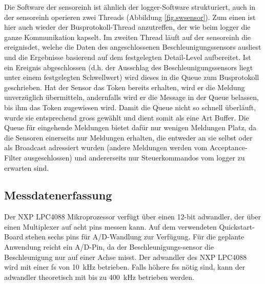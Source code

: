Die Software der \gls{sensoreinh} ist ähnlich der \gls{logger}-Software strukturiert, auch in der \gls{sensoreinh} operieren zwei Threads (Abbildung \ref{fig.swsensor}). Zum einen ist hier auch wieder der Busprotokoll-Thread anzutreffen, der wie beim \gls{logger} die ganze Kommunikation kapselt. Im zweiten Thread läuft auf der \gls{sensoreinh} die \gls{ereignisdet}, welche die Daten des angeschlossenen Beschleunigungssensors ausliest und die Ergebnisse basierend auf dem festgelegten Detail-Level aufbereitet. Ist ein Ereignis abgeschlossen (d.h. der Ausschlag des Beschleunigungssensors liegt unter einem festgelegten Schwellwert) wird dieses in die Queue zum Busprotokoll geschrieben. Hat der Sensor das Token bereits erhalten, wird er die Meldung unverzüglich übermitteln, andernfalls wird er die Message in der Queue belassen, bis ihm das Token zugewiesen wird. Damit die Queue nicht so schnell überläuft, wurde sie entsprechend gross gewählt und dient somit als eine Art Buffer. Die Queue für eingehende Meldungen bietet dafür nur wenigen Meldungen Platz, da die Sensoren einerseits nur Meldungen erhalten, die entweder an sie selbst oder als Broadcast adressiert wurden (andere Meldungen werden vom Acceptance-Filter ausgeschlossen) und andererseits nur Steuerkommandos vom \gls{logger} zu erwarten sind.


\subsection{Messdatenerfassung}\label{subsec.sw_messen}
Der NXP LPC4088 Mikroprozessor verfügt über einen 12-bit \gls{adwandler}, der über einen Multiplexer auf acht \glspl{pin} messen kann. Auf dem verwendeten Quickstart-Board stehen sechs \glspl{pin} für A/D-Wandlung zur Verfügung. Für die geplante Anwendung reicht ein A/D-Pin, da der Beschleunigungs-\gls{sensor} die Beschleunigung nur auf einer Achse misst. Der \gls{adwandler} des NXP LPC4088 wird mit einer \gls{fs} von 10~kHz betrieben. Falls höhere \glspl{fs} nötig sind, kann der \gls{adwandler} theoretisch mit bis zu 400~kHz betrieben werden.

